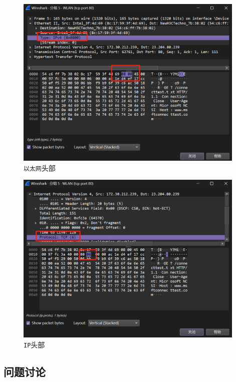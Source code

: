 \documentclass{article}
\begin{document}
	\begin{figure}[H]
		\centering
		\includegraphics[width=11cm]{images/14.Type字段.png}
		\caption{\texttt{以太网}头部}
	\end{figure}
	
	\begin{figure}[H]
		\centering
		\includegraphics[width=11cm]{images/15.Protocol字段.png}
		\caption{\texttt{IP}头部}
	\end{figure}
	
	\subsection{问题讨论}
	
\end{document}
